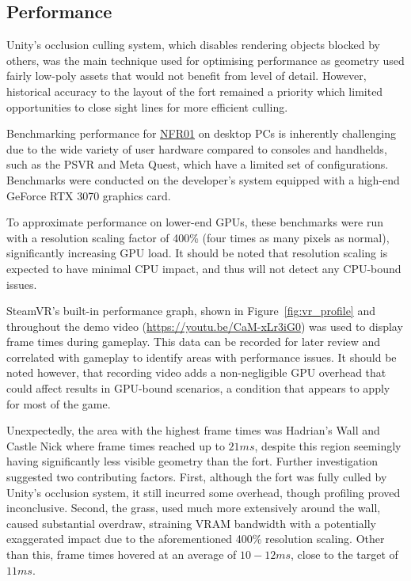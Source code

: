 \documentclass[sigconf]{acmart}
\begin{document}
\subsection{Performance}

Unity's occlusion culling system, which disables rendering objects blocked by others,
was the main technique used for optimising performance as geometry used fairly low-poly
assets that would not benefit from level of detail. However, historical accuracy
to the layout of the fort remained a priority which limited opportunities to close
sight lines for more efficient culling.

Benchmarking performance for \hyperref[sec:nfr_performance]{NFR01} on desktop PCs
is inherently challenging due to the wide variety of user hardware compared to consoles
and handhelds, such as the PSVR and Meta Quest, which have a limited set of configurations.
Benchmarks were conducted on the developer's system equipped with a high-end GeForce RTX 3070
graphics card.

To approximate performance on lower-end GPUs, these benchmarks were run with a
resolution scaling factor of 400\% (four times as many pixels as normal),
significantly increasing GPU load. It should be noted that resolution scaling
is expected to have minimal CPU impact, and thus will not detect any CPU-bound
issues.

SteamVR's built-in performance graph, shown in Figure~\ref{fig:vr_profile} and
throughout the demo video (\url{https://youtu.be/CaM-xLr3iG0}) was used to display frame
times during gameplay. This data can be recorded for later review and correlated
with gameplay to identify areas with performance issues. It should be noted however,
that recording video adds a non-negligible GPU overhead that could affect results
in GPU-bound scenarios, a condition that appears to apply for most of the game.

Unexpectedly, the area with the highest frame times was Hadrian's Wall and Castle Nick
where frame times reached up to $21ms$, despite this region seemingly having
significantly less visible geometry than the fort. Further investigation suggested
two contributing factors. First, although the fort was fully culled by Unity's
occlusion system, it still incurred some overhead, though profiling proved inconclusive.
Second, the grass, used much more extensively around the wall, caused substantial
overdraw, straining VRAM bandwidth with a potentially exaggerated impact due to the
aforementioned 400\% resolution scaling. Other than this, frame times hovered at
an average of $10-12ms$, close to the target of $11ms$.
\end{document}
